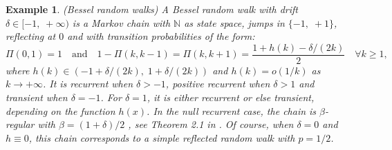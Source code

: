 \documentclass[sn-mathphys-ay]{sn-jnl}%
\newtheorem{example}{Example}%
\begin{document}
\begin{example}\label{ex1}{\sc (Bessel random walks)} A \textit{Bessel random walk} with drift $\delta\in [-1,\; +\infty)$ is a Markov
    chain with $\mathbb{N}$ as state space, jumps in $\{-1,\; +1\}$, reflecting at $0$
    and with transition probabilities of the form:
    \begin{equation*}
        \Pi(0,1) = 1 \quad \text{and} \quad 1-\Pi(k, k-1) = \Pi(k, k+1) = \frac{1+h(k)-\delta/(2k)}{2}\quad \forall k \geq 1,
    \end{equation*}
    where
    $h(k)\in(-1+\delta/(2k),\; 1+\delta/(2k))$ and \(h( k) = o(1/k)\) as \(k\to+\infty\).
    It is recurrent when \(\delta>-1\), positive recurrent when \(\delta>1\) and
    transient when \(\delta=-1\). For \(\delta=1\), it is either recurrent or else
    transient, depending on the function \(h(x)\). In the null recurrent case, the chain
    is \(\beta\)-regular with \(\beta = (1+\delta)/2\) , see Theorem 2.1 in
    \cite{Alexander2011}. Of course, when \(\delta=0\) and \(h\equiv 0\), this chain
    corresponds to a simple reflected random walk with \(p=1/2\).
\end{example}

\end{document}
